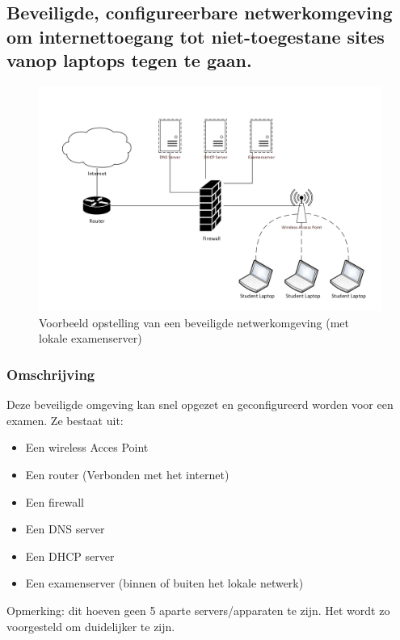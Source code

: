 	
	
\newpage

\subsection{Beveiligde, configureerbare netwerkomgeving om internettoegang tot niet-toegestane sites vanop laptops tegen te gaan.	}

	\begin{figure}
	\includegraphics[width=\linewidth]{img/OpstellingNWOMG}
	\caption{Voorbeeld opstelling van een beveiligde netwerkomgeving (met lokale examenserver)}
	\label{fig:Omgeving1}
\end{figure}

\subsubsection{Omschrijving}
Deze beveiligde omgeving kan snel opgezet en geconfigureerd worden voor een examen. Ze bestaat uit:
\begin{itemize}
\item Een wireless Acces Point
\item Een router (Verbonden met het internet)
\item Een firewall
\item Een DNS server
\item Een DHCP server
\item Een examenserver (binnen of buiten het lokale netwerk)

\end{itemize}
Opmerking: dit hoeven geen 5 aparte servers/apparaten te zijn. Het wordt zo voorgesteld om duidelijker te zijn.

